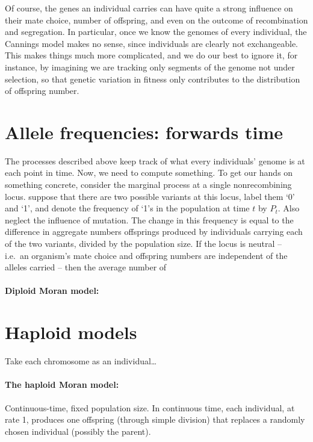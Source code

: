 Of course, the genes an individual carries can have quite a strong influence
on their mate choice, number of offspring, and even on the outcome of recombination and segregation.
In particular, once we know the genomes of every individual, the Cannings model makes no sense,
since individuals are clearly not exchangeable.
This makes things much more complicated,
and we do our best to ignore it,
for instance, by imagining we are tracking only segments of the genome not under selection,
so that genetic variation in fitness only contributes to the distribution of offspring number.



\section{Allele frequencies: forwards time}

The processes described above keep track of what every individuals' genome is at each point in time.
Now, we need to compute something.
To get our hands on something concrete, consider the marginal process at a single nonrecombining locus.
suppose that there are two possible variants at this locus,
label them `0' and `1',
and denote the frequency of `1's in the population at time $t$ by $P_t$.
Also neglect the influence of mutation.
The change in this frequency is equal to the difference in aggregate numbers offsprings produced by individuals 
carrying each of the two variants,
divided by the population size.
If the locus is neutral
-- i.e.\ an organism's mate choice and offspring numbers are independent of the alleles carried --
then the average number of 

\paragraph{Diploid Moran model:}


\section{Haploid models}

Take each chromosome as an individual\ldots

\paragraph{The haploid Moran model:}
Continuous-time, fixed population size.
In continuous time, each individual, at rate 1, 
produces one offspring (through simple division)
that replaces a randomly chosen individual (possibly the parent).

